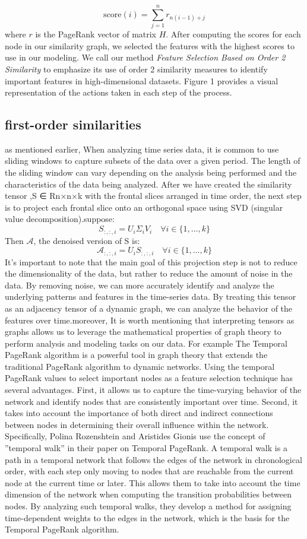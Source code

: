 \documentclass[twoside,11pt]{article}
\begin{document}
\[  
\text{score}(i) = \sum_{j=1}^{n} r_{n(i-1) + j}  
\]  
where \( r \) is the PageRank vector of matrix \( H \). After computing the scores for each node in our similarity graph, we selected the features with the highest scores to use in our modeling. We call our method \textit{Feature Selection Based on Order 2 Similarity} to emphasize its use of order 2 similarity measures to identify important features in high-dimensional datasets. Figure 1 provides a visual representation of the actions taken in each step of the process.
\subsection{first-order similarities}
as mentioned earlier, When analyzing time series data, it is common to use sliding windows
to capture subsets of the data over a given period. The length of the sliding window can vary depending on the analysis being performed and the characteristics of the data being
analyzed.
After we have created the similarity tensor ,S ∈ Rn×n×k with the frontal slices arranged
in time order, the next step is to project each frontal slice onto an orthogonal space using
SVD (singular value decomposition).suppose:
\[  
S_{:,:,i} = U_i \Sigma_i V_i \quad \forall i \in \{1, \ldots, k\}  
\]
Then \(\mathcal{A}\), the denoised version of S is:
\[  
\mathcal{A}_{:,:,i} = U_i S_{:,:,i} \quad \forall i \in \{1, \ldots, k\}  
\]
It’s important to note that the main goal of this projection step is not to reduce the dimensionality of the data, but rather to reduce the amount of noise in the data. By removing
noise, we can more accurately identify and analyze the underlying patterns and features in
the time-series data.
By treating this tensor as an adjacency tensor of a dynamic graph, we can analyze the
behavior of the features over time.moreover, It is worth mentioning that interpreting tensors
as graphs allows us to leverage the mathematical properties of graph theory to perform
analysis and modeling tasks on our data. For example The Temporal PageRank algorithm
is a powerful tool in graph theory that extends the traditional PageRank algorithm to
dynamic networks.
Using the temporal PageRank values to select important nodes as a feature selection
technique has several advantages. First, it allows us to capture the time-varying behavior
of the network and identify nodes that are consistently important over time. Second, it
takes into account the importance of both direct and indirect connections between nodes
in determining their overall influence within the network.
Specifically, Polina Rozenshtein and Aristides Gionis use the concept of ”temporal walk”
in their paper on Temporal PageRank. A temporal walk is a path in a temporal network
that follows the edges of the network in chronological order, with each step only moving to nodes that are reachable from the current node at the current time or later. This allows
them to take into account the time dimension of the network when computing the transition
probabilities between nodes. By analyzing such temporal walks, they develop a method for
assigning time-dependent weights to the edges in the network, which is the basis for the
Temporal PageRank algorithm.
\end{document}
